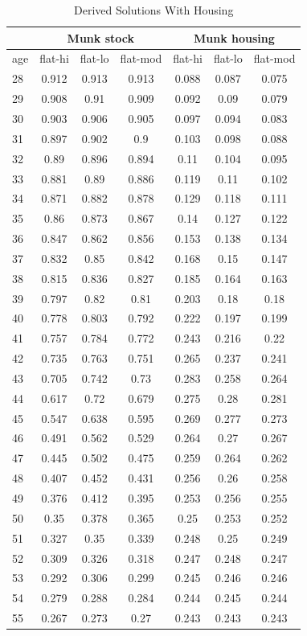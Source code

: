 \documentclass[]{article}
\begin{document}
\begin{appendix}
\clearpage
\renewcommand*{\arraystretch}{0.9}
\begin{longtable}{|l|ccc|ccc|}
	\caption[]{Derived Solutions With Housing}
		\hline
		&\multicolumn{3}{|c|}{Munk stock}&\multicolumn{3}{c|}{Munk housing}\\
		\hline
		age&flat-hi&flat-lo&flat-mod&flat-hi&flat-lo&flat-mod\\
		\hline
28&0.912&0.913&0.913&0.088&0.087&0.075\\
29&0.908&0.91&0.909&0.092&0.09&0.079\\
30&0.903&0.906&0.905&0.097&0.094&0.083\\
31&0.897&0.902&0.9&0.103&0.098&0.088\\
32&0.89&0.896&0.894&0.11&0.104&0.095\\
33&0.881&0.89&0.886&0.119&0.11&0.102\\
34&0.871&0.882&0.878&0.129&0.118&0.111\\
35&0.86&0.873&0.867&0.14&0.127&0.122\\
36&0.847&0.862&0.856&0.153&0.138&0.134\\
37&0.832&0.85&0.842&0.168&0.15&0.147\\
38&0.815&0.836&0.827&0.185&0.164&0.163\\
39&0.797&0.82&0.81&0.203&0.18&0.18\\
40&0.778&0.803&0.792&0.222&0.197&0.199\\
41&0.757&0.784&0.772&0.243&0.216&0.22\\
42&0.735&0.763&0.751&0.265&0.237&0.241\\
43&0.705&0.742&0.73&0.283&0.258&0.264\\
44&0.617&0.72&0.679&0.275&0.28&0.281\\
45&0.547&0.638&0.595&0.269&0.277&0.273\\
46&0.491&0.562&0.529&0.264&0.27&0.267\\
47&0.445&0.502&0.475&0.259&0.264&0.262\\
48&0.407&0.452&0.431&0.256&0.26&0.258\\
49&0.376&0.412&0.395&0.253&0.256&0.255\\
50&0.35&0.378&0.365&0.25&0.253&0.252\\
51&0.327&0.35&0.339&0.248&0.25&0.249\\
52&0.309&0.326&0.318&0.247&0.248&0.247\\
53&0.292&0.306&0.299&0.245&0.246&0.246\\
54&0.279&0.288&0.284&0.244&0.245&0.244\\
55&0.267&0.273&0.27&0.243&0.243&0.243\\

\end{longtable}
\end{appendix}
\end{document}
